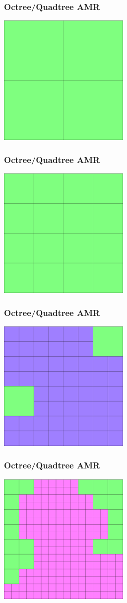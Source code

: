 \documentclass{beamer}
\begin{document}
\begin{frame}
\frametitle{Octree/Quadtree AMR}
\centerline{\includegraphics[width=2.5in]{norman-1.eps}}
\end{frame}
\begin{frame}
\frametitle{Octree/Quadtree AMR}
\centerline{\includegraphics[width=2.5in]{norman-2.eps}}
\end{frame}
\begin{frame}
\frametitle{Octree/Quadtree AMR}
\centerline{\includegraphics[width=2.5in]{norman-3.eps}}
\end{frame}
\begin{frame}
\frametitle{Octree/Quadtree AMR}
\centerline{\includegraphics[width=2.5in]{norman-4.eps}}
\end{frame}
\end{document}
